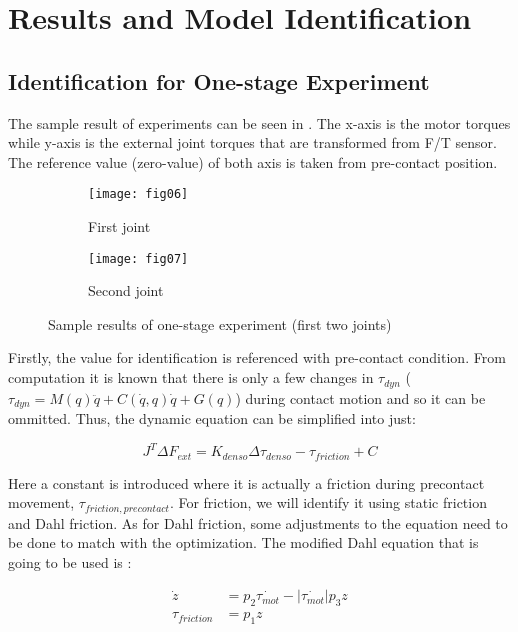 \chapter{Results and Model Identification}
\section{Identification for One-stage Experiment}

The sample result of experiments can be seen in . The x-axis is the motor torques while y-axis is the external joint torques that are transformed from F/T sensor. The reference value (zero-value) of both axis is taken from pre-contact position. 

\begin{figure}[H]
  \begin{subfigure}[t]{0.5\textwidth}
    \centering
    \texttt{[image: fig06]} 
    \caption{First joint}
  \end{subfigure}
  \begin{subfigure}[t]{0.5\textwidth}
    \centering
    \texttt{[image: fig07]}
    \caption{Second joint}
  \end{subfigure}
  \caption{Sample results of one-stage experiment (first two joints)}
  \label{fig:one-stage}
\end{figure}

Firstly, the value for identification is referenced with pre-contact condition. From computation it is known that there is only a few changes in $\tau_{dyn}$ ($\tau_{dyn} = M\left(q\right)\ddot{q} + C\left(\dot{q} , q \right)\dot{q} + G\left(q \right)$) during contact motion and so it can be ommitted. Thus, the dynamic equation can be simplified into just:

\begin{equation}
  J^{T} \Delta F_{ext} = K_{denso} \Delta \tau_{denso} - \tau_{friction} + C
\end{equation}
 
Here a constant is introduced where it is actually a friction during precontact movement, $\tau_{friction,precontact}$. For friction, we will identify it using static friction and Dahl friction. As for Dahl friction, some adjustments to the equation need to be done to match with the optimization. The modified Dahl equation that is going to be used is : 

\begin{align}
  \dot{z} &= p_{2 }\dot{\tau_{mot}} - \left|\dot{\tau_{mot}}\right| p_{3} z \\
  \tau_{friction} &= p_{1} z
\end{align}

